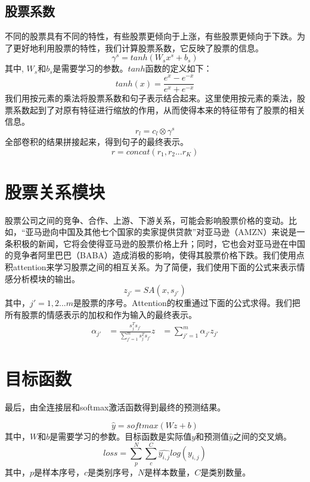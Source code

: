 \subsection{股票系数}
不同的股票具有不同的特性，有些股票更倾向于上涨，有些股票更倾向于下跌。为了更好地利用股票的特性，我们计算股票系数，它反映了股票的信息。
\begin{equation}
    \gamma ^ s = tanh(W_sx ^ s+b_s)
\end{equation}
其中, $W_s$和$b_s$是需要学习的参数。$tanh$函数的定义如下：
\begin{equation}
    tanh(x) =\frac{e ^ x-e ^ {-x}}{e ^ x+e ^ {-x}}
\end{equation}
我们用按元素的乘法将股票系数和句子表示结合起来。这里使用按元素的乘法，股票系数起到了对原有特征进行缩放的作用，从而使得本来的特征带有了股票的相关信息。
\begin{equation}
    r_l = c_l\otimes \gamma ^ s
\end{equation}
全部卷积的结果拼接起来，得到句子的最终表示。
\begin{equation}
    r = concat(r_1, r_2...r_K)
\end{equation}
\section{股票关系模块}
股票公司之间的竞争、合作、上游、下游关系，可能会影响股票价格的变动。比如，“亚马逊向中国及其他七个国家的卖家提供贷款”对亚马逊（AMZN）来说是一条积极的新闻，它将会使得亚马逊的股票价格上升；同时，它也会对亚马逊在中国的竞争者阿里巴巴（BABA）造成消极的影响，使得其股票价格下跌。我们使用点积attention来学习股票之间的相互关系。为了简便，我们使用下面的公式来表示情感分析模块的输出。
\begin{equation}
    z_{j'}=SA(x,s_{j'})
\end{equation}
其中，$j'=1, 2...m$是股票的序号。Attention的权重通过下面的公式求得。我们把所有股票的情感表示的加权和作为输入的最终表示。
\begin{equation}
    \begin{aligned}
        \alpha_{j'}&=\frac{s^T_{j}s_{j'}}{\sum_{j'=1}^{m}s^T_{j}s_{j'}}
        z &= \sum_{j'=1}^{m} \alpha_{j'}z_{j'}
    \end{aligned}
\end{equation}
\section{目标函数}

最后，由全连接层和softmax激活函数得到最终的预测结果。

\begin{equation}
    \hat{y}=softmax(Wz+b)
\end{equation}
其中，$W$和$b$是需要学习的参数。目标函数是实际值$y$和预测值$\hat{y}$之间的交叉熵。
\begin{equation}
    loss=\sum_{p} ^ {N}\sum_{c} ^ {C}\hat{y_{i, j}}log(y_{i, j})
\end{equation}
其中，$p$是样本序号，$c$是类别序号，$N$是样本数量，$C$是类别数量。
